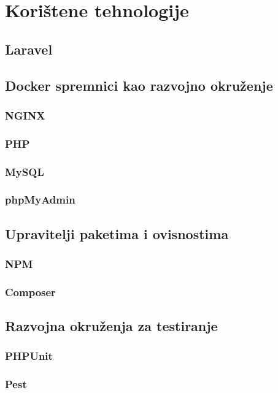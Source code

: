 \section{Korištene tehnologije}

\subsection{Laravel}
 
\subsection{Docker spremnici kao razvojno okruženje}

\subsubsection{NGINX}

\subsubsection{PHP}

\subsubsection{MySQL}

\subsubsection{phpMyAdmin}

\subsection{Upravitelji paketima i ovisnostima}

\subsubsection{NPM}

\subsubsection{Composer}

\subsection{Razvojna okruženja za testiranje}

\subsubsection{PHPUnit}

\subsubsection{Pest}
